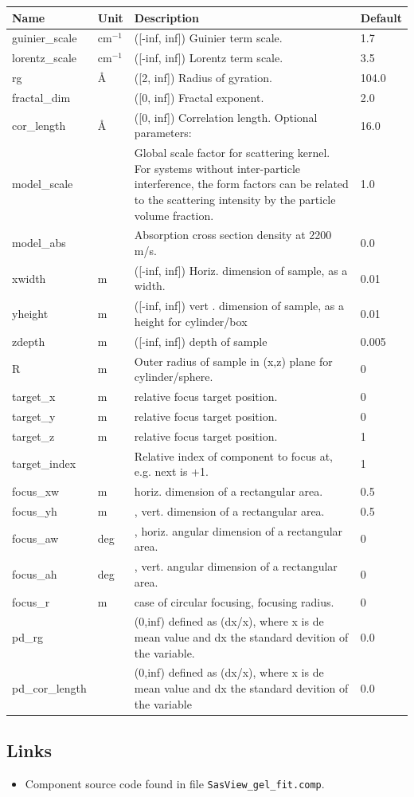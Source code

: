 \begin{longtable}{p{}p{}p{}p{}}
\toprule
\textbf{Name} & \textbf{Unit} & \textbf{Description} & \textbf{Default} \\
\midrule
\endhead
guinier\_scale & cm$^{-1}$ & ([-inf, inf]) Guinier term scale. & 1.7 \\
lorentz\_scale & cm$^{-1}$ & ([-inf, inf]) Lorentz term scale. & 3.5 \\
rg & \AA{} & ([2, inf]) Radius of gyration. & 104.0 \\
fractal\_dim &  & ([0, inf]) Fractal exponent. & 2.0 \\
cor\_length & \AA{} & ([0, inf]) Correlation length. Optional parameters: & 16.0 \\
model\_scale &   & Global scale factor for scattering kernel. For systems without inter-particle interference, the form factors can be related to the scattering intensity by the particle volume fraction. & 1.0 \\
model\_abs &   & Absorption cross section density at 2200 m/s. & 0.0 \\
xwidth & m & ([-inf, inf]) Horiz. dimension of sample, as a width. & 0.01 \\
yheight & m & ([-inf, inf]) vert . dimension of sample, as a height for cylinder/box & 0.01 \\
zdepth & m & ([-inf, inf]) depth of sample & 0.005 \\
R & m & Outer radius of sample in (x,z) plane for cylinder/sphere. & 0 \\
target\_x & m & relative focus target position. & 0 \\
target\_y & m & relative focus target position. & 0 \\
target\_z & m & relative focus target position. & 1 \\
target\_index &   & Relative index of component to focus at, e.g. next is +1. & 1 \\
focus\_xw & m & horiz. dimension of a rectangular area. & 0.5 \\
focus\_yh & m & , vert. dimension of a rectangular area. & 0.5 \\
focus\_aw & deg & , horiz. angular dimension of a rectangular area. & 0 \\
focus\_ah & deg & , vert. angular dimension of a rectangular area. & 0 \\
focus\_r & m & case of circular focusing, focusing radius. & 0 \\
pd\_rg &  & (0,inf) defined as (dx/x), where x is de mean value and dx the standard devition of the variable. & 0.0 \\
pd\_cor\_length &  & (0,inf) defined as (dx/x), where x is de mean value and dx the standard devition of the variable & 0.0 \\
\bottomrule
\end{longtable}

\subsection*{Links}
\begin{itemize}
  \item Component source code found in file \texttt{SasView\_gel\_fit.comp}.
\end{itemize}
